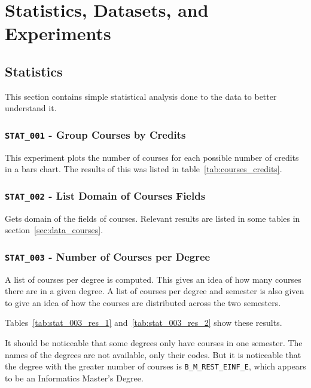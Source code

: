 \chapter{Statistics, Datasets, and Experiments}

\section{Statistics}

This section contains simple statistical analysis done to the data to better
understand it.

\subsection{\texttt{STAT\_001} - Group Courses by Credits}

This experiment plots the number of courses for each possible number of credits
in a bars chart. The results of this was listed in
table~\ref{tab:courses_credits}.

\subsection{\texttt{STAT\_002} - List Domain of Courses Fields}

Gets domain of the fields of courses. Relevant results are listed in some
tables in section~\ref{sec:data_courses}.

\subsection{\texttt{STAT\_003} - Number of Courses per Degree}

A list of courses per degree is computed. This gives an idea of how many
courses there are in a given degree. A list of courses per degree and semester
is also given to give an idea of how the courses are distributed across the two
semesters.

Tables~\ref{tab:stat_003_res_1} and~\ref{tab:stat_003_res_2} show these results.

It should be noticeable that some degrees only have courses in one semester.
The names of the degrees are not available, only their codes. But it is
noticeable that the degree with the greater number of courses is
\texttt{B\_M\_REST\_EINF\_E}, which appears to be an Informatics Master's
Degree.

